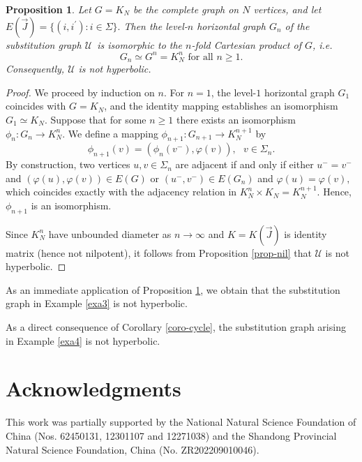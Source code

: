 \documentclass[reqno]{amsart}
\theoremstyle{plain}
\newtheorem{proposition}{Proposition}
\numberwithin{equation}{section}
\begin{document}
\begin{proposition}
\label{prop-Cartesian}Let $G=K_{N}$ be the complete graph on $N$ vertices,
and let $E(\overrightarrow{J})=\{(i,i^{\prime }):i\in \Sigma \}.$ Then the
level-$n$ horizontal graph $G_{n}$ of the substitution graph $\mathcal{U}$\
is isomorphic to the $n$-fold Cartesian product of $G$, i.e. 
\begin{equation*}
G_{n}\simeq G^{n}=K_{N}^{n}\text{ for all }n\geq 1.
\end{equation*}%
Consequently, $\mathcal{U}$ is not hyperbolic.
\end{proposition}

\begin{proof}
We proceed by induction on $n$. For $n=1$, the level-$1$ horizontal graph $%
G_{1}$ coincides with $G=K_{N}$, and the identity mapping establishes an
isomorphism $G_{1}\simeq K_{N}$. Suppose that for some $n\geq 1$ there
exists an isomorphism $\phi _{n}:G_{n}\rightarrow K_{N}^{n}.$ We define a
mapping $\phi _{n+1}:G_{n+1}\rightarrow K_{N}^{n+1}$ by 
\begin{equation*}
\phi _{n+1}(v)=(\phi _{n}(v^{-}),\varphi (v)),\text{ }v\in \Sigma _{n}.
\end{equation*}%
By construction, two vertices $u,v\in \Sigma _{n}$ are adjacent if and only
if either $u^{-}=v^{-}$ and $(\varphi (u),\varphi (v))\in E(G)$ or $%
(u^{-},v^{-})\in E(G_{n})$ and $\varphi (u)=\varphi (v),$ which coincides
exactly with the adjacency relation in $K_{N}^{n}\times K_{N}=K_{N}^{n+1}.$
Hence, $\phi _{n+1}$ is an isomorphism.

Since $K_{N}^{n}$ have unbounded diameter as $n\rightarrow \infty $ and $K=K(%
\overrightarrow{J})$ is identity matrix (hence not nilpotent), it follows
from Proposition \ref{prop-nil} that $\mathcal{U}$ is not hyperbolic.
\end{proof}

As an immediate application of Proposition \ref{prop-Cartesian}, we obtain
that the substitution graph in Example \ref{exa3} is not hyperbolic.

As a direct consequence of Corollary \ref{coro-cycle}, the substitution
graph arising in Example \ref{exa4} is not hyperbolic.

\bigskip

\section{Acknowledgments}

This work was partially supported by the National Natural Science Foundation
of China (Nos. 62450131, 12301107 and 12271038) and the Shandong Provincial
Natural Science Foundation, China (No. ZR202209010046).
\end{document}
